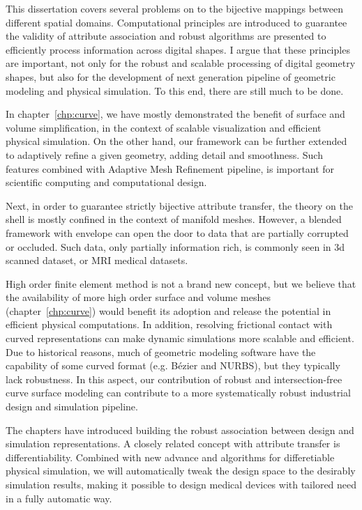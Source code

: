 This dissertation covers several problems on to the bijective mappings between different spatial domains. Computational principles are introduced to guarantee the validity of attribute association and robust algorithms are presented to efficiently process information across digital shapes. I argue that these principles are important, not only for the robust and scalable processing of digital geometry shapes, but also for the development of next generation pipeline of geometric modeling and physical simulation. To this end, there are still much to be done.


In chapter~\ref{chp:curve}, we have mostly demonstrated the benefit of surface and volume simplification, in the context of scalable visualization and efficient physical simulation. On the other hand, our framework can be further extended to adaptively refine a given geometry, adding detail and smoothness. Such features combined with Adaptive Mesh Refinement pipeline, is important for scientific computing and computational design.

Next, in order to guarantee strictly bijective attribute transfer, the theory on the shell is mostly confined in the context of manifold meshes. However, a blended framework with envelope \cite{hu2018tetrahedral, Wang:2021} can open the door to  data that are partially corrupted or occluded. Such data, only partially information rich, is commonly seen in 3d scanned dataset, or MRI medical datasets.

High order finite element method is not a brand new concept, but we believe that the availability of more high order surface and volume meshes (chapter~\ref{chp:curve}) would benefit its adoption and release the potential in efficient physical computations. In addition, resolving frictional contact with curved representations \cite{Li2020IPC} can make dynamic simulations more scalable and efficient. 
Due to historical reasons, much of geometric modeling software have the capability of some curved format (e.g. B{\'e}zier and NURBS), but they typically lack robustness. In this aspect, our contribution of robust and intersection-free curve surface modeling can contribute to a more systematically robust industrial design and simulation pipeline.

The chapters have introduced building the robust association between design and simulation representations. A closely related concept with attribute transfer is differentiability. Combined with new advance and algorithms for differetiable physical simulation, we will automatically tweak the design space to the desirably simulation results, making it possible to design medical devices with tailored need in a fully automatic way.

